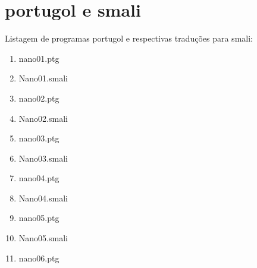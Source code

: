 \documentclass[12pt,a4paper,twoside]{report}
\begin{document}
\section{portugol e smali}
Listagem de programas portugol e respectivas traduções para smali:
\begin{enumerate}
\item nano01.ptg


\item Nano01.smali


\item nano02.ptg


\item Nano02.smali


\item nano03.ptg


\item Nano03.smali


\item nano04.ptg


\item Nano04.smali


\item nano05.ptg


\item Nano05.smali


\item nano06.ptg



\end{enumerate}
\end{document}
